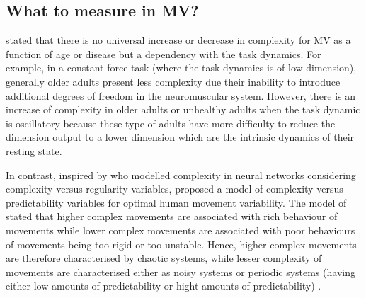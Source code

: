 \subsection{What to measure in MV?} \label{what_to_measure_with_MV}
\cite{vaillancourt2002, vaillancourt2003} stated that there is no universal 
increase or decrease in complexity for MV as a function of age or disease 
but a dependency with the task dynamics. For example, in a constant-force 
task (where the task dynamics is of low dimension), generally older adults 
present less complexity due their inability to introduce additional degrees 
of freedom in the neuromuscular system. However, there is an increase of 
complexity in older adults or unhealthy adults when the task dynamic is 
oscillatory because these type of adults have more difficulty to reduce 
the dimension output to a lower dimension which are the intrinsic dynamics 
of their resting state.

In contrast, inspired by \cite{tononi1998} who modelled complexity 
in neural networks considering complexity versus regularity variables,
\cite{stergiou2006} proposed a model of complexity versus predictability 
variables for optimal human movement variability.
The model of \cite{stergiou2006} stated that higher complex movements are 
associated with rich behaviour of movements while lower complex movements 
are associated with poor behaviours of movements being too rigid or too 
unstable. Hence, higher complex movements are therefore characterised by 
chaotic systems, while lesser complexity of movements are characterised either 
as noisy systems or periodic systems (having either low amounts of 
predictability or hight amounts of predictability) \citep{stergiou2006}.



